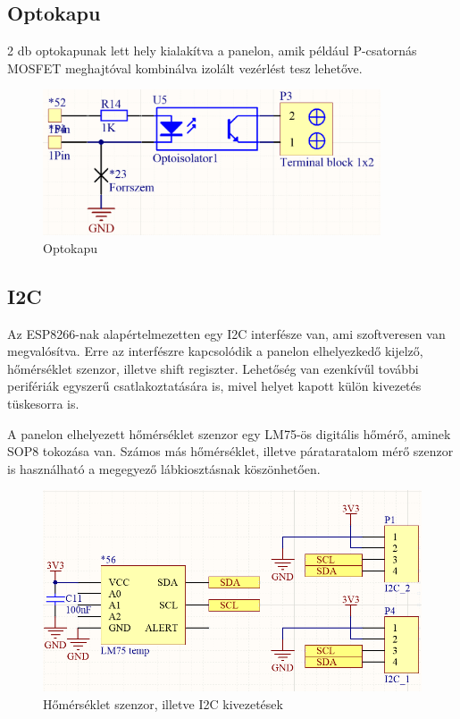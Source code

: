 \subsection{Optokapu}
2 db optokapunak lett hely kialakítva a panelon, amik például P-csatornás MOSFET meghajtóval kombinálva izolált vezérlést tesz lehetőve.

\begin{figure}[!ht]
    \centering
    \includegraphics[width=100mm, keepaspectratio]{figures/opto.png}
    \caption{Optokapu}
    \label{fig:TeXstudio}
\end{figure}


\subsection{I2C}
Az ESP8266-nak alapértelmezetten egy I2C interfésze van, ami szoftveresen van megvalósítva. Erre az interfészre kapcsolódik a panelon elhelyezkedő kijelző, hőmérséklet szenzor, illetve shift regiszter. Lehetőség van ezenkívűl további perifériák egyszerű csatlakoztatására is, mivel helyet kapott külön kivezetés tüskesorra is.

A panelon elhelyezett hőmérséklet szenzor egy LM75-ös digitális hőmérő, aminek SOP8 tokozása van. Számos más hőmérséklet, illetve párataratalom mérő szenzor is használható a megegyező lábkiosztásnak köszönhetően.
\begin{figure}[!ht]
    \centering
    \includegraphics[width=130mm, keepaspectratio]{figures/i2c_devices.png}
    \caption{Hőmérséklet szenzor, illetve I2C kivezetések}
    \label{fig:TeXstudio}
\end{figure}


